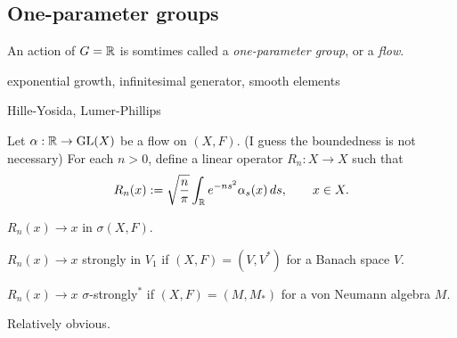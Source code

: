 \documentclass{../../../small}
\begin{document}
\subsection{One-parameter groups}

An action of $G=\mathbb{R}$ is somtimes called a \emph{one-parameter group}, or a \emph{flow}.


\begin{prop}
exponential growth, infinitesimal generator, smooth elements
\end{prop}

\begin{prop}
Hille-Yosida, Lumer-Phillips
\end{prop}



\begin{prop}
Let $\alpha:\mathbb{R}\to\mathrm{GL}(X)$ be a flow on $(X,F)$.
(I guess the boundedness is not necessary)
For each $n>0$, define a linear operator $R_n:X\to X$ such that
\[R_n(x):=\sqrt{\frac n\pi}\int_{\mathbb{R}} e^{-ns^2}\alpha_s(x)\,ds,\qquad x\in X.\]
\begin{parts}
\item $R_n(x)\to x$ in $\sigma(X,F)$.
\item $R_n(x)\to x$ strongly in $V_1$ if $(X,F)=(V,V^*)$ for a Banach space $V$.
\item $R_n(x)\to x$ $\sigma$-strongly$^*$ if $(X,F)=(M,M_*)$ for a von Neumann algebra $M$.
\end{parts}
\end{prop}
\begin{pf}
Relatively obvious.
\end{pf}
\end{document}
